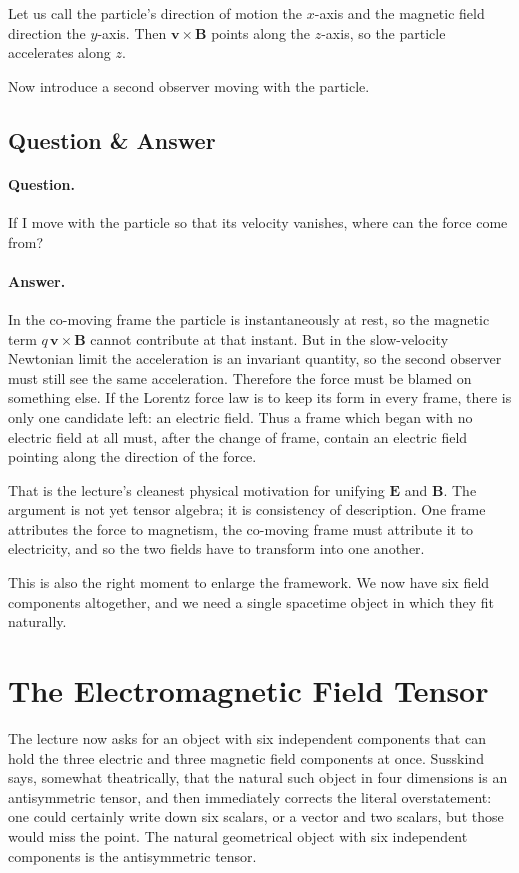 Let us call the particle's direction of motion the \(x\)-axis and the magnetic field direction the \(y\)-axis. Then \(\mathbf v\times\mathbf B\) points along the \(z\)-axis, so the particle accelerates along \(z\).

Now introduce a second observer moving with the particle.

\subsection{Question \& Answer}

\paragraph{Question.} If I move with the particle so that its velocity vanishes, where can the force come from?

\paragraph{Answer.} In the co-moving frame the particle is instantaneously at rest, so the magnetic term \(q\,\mathbf v\times\mathbf B\) cannot contribute at that instant. But in the slow-velocity Newtonian limit the acceleration is an invariant quantity, so the second observer must still see the same acceleration. Therefore the force must be blamed on something else. If the Lorentz force law is to keep its form in every frame, there is only one candidate left: an electric field. Thus a frame which began with no electric field at all must, after the change of frame, contain an electric field pointing along the direction of the force.

That is the lecture's cleanest physical motivation for unifying \(\mathbf E\) and \(\mathbf B\). The argument is not yet tensor algebra; it is consistency of description. One frame attributes the force to magnetism, the co-moving frame must attribute it to electricity, and so the two fields have to transform into one another.

This is also the right moment to enlarge the framework. We now have six field components altogether, and we need a single spacetime object in which they fit naturally.

\section{The Electromagnetic Field Tensor}

The lecture now asks for an object with six independent components that can hold the three electric and three magnetic field components at once. Susskind says, somewhat theatrically, that the natural such object in four dimensions is an antisymmetric tensor, and then immediately corrects the literal overstatement: one could certainly write down six scalars, or a vector and two scalars, but those would miss the point. The natural geometrical object with six independent components is the antisymmetric tensor.

